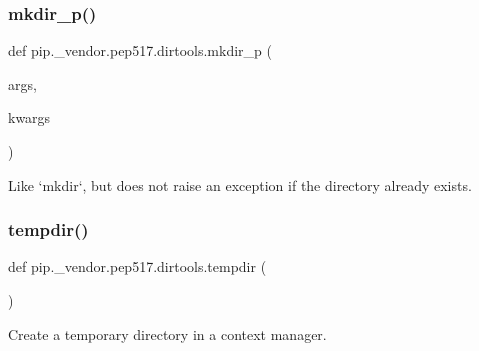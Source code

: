 \subsubsection{\texorpdfstring{mkdir\+\_\+p()}{mkdir\_p()}}
{\footnotesize\ttfamily def pip.\+\_\+vendor.\+pep517.\+dirtools.\+mkdir\+\_\+p (\begin{DoxyParamCaption}\item[{}]{args,  }\item[{}]{kwargs }\end{DoxyParamCaption})}

\begin{DoxyVerb}Like `mkdir`, but does not raise an exception if the
directory already exists.
\end{DoxyVerb}
 \mbox{\label{namespacepip_1_1__vendor_1_1pep517_1_1dirtools_a5742a1a2b5646e0b29984f2f1cbdf26b}} 
\subsubsection{\texorpdfstring{tempdir()}{tempdir()}}
{\footnotesize\ttfamily def pip.\+\_\+vendor.\+pep517.\+dirtools.\+tempdir (\begin{DoxyParamCaption}{ }\end{DoxyParamCaption})}

\begin{DoxyVerb}Create a temporary directory in a context manager.\end{DoxyVerb}
 